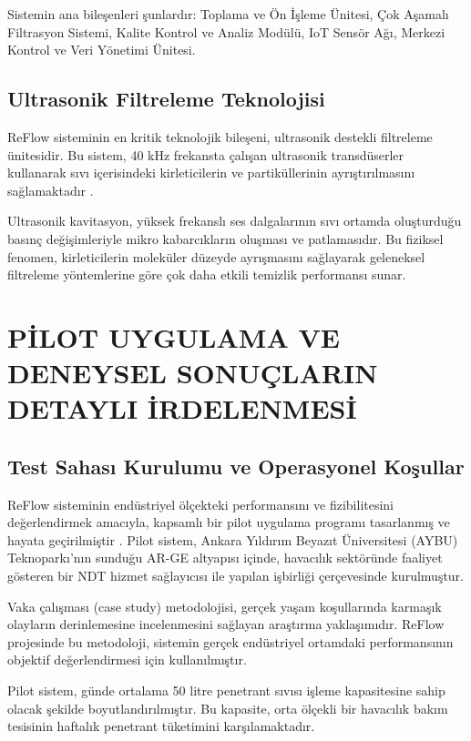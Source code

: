 \documentclass[12pt,a4paper]{article}
\begin{document}
Sistemin ana bileşenleri şunlardır: Toplama ve Ön İşleme Ünitesi, Çok Aşamalı Filtrasyon Sistemi, Kalite Kontrol ve Analiz Modülü, IoT Sensör Ağı, Merkezi Kontrol ve Veri Yönetimi Ünitesi.

\subsection{Ultrasonik Filtreleme Teknolojisi}

ReFlow sisteminin en kritik teknolojik bileşeni, ultrasonik destekli filtreleme ünitesidir. Bu sistem, 40 kHz frekansta çalışan ultrasonik transdüserler kullanarak sıvı içerisindeki kirleticilerin ve partiküllerinin ayrıştırılmasını sağlamaktadır \cite{zhang2018filtration}.

Ultrasonik kavitasyon, yüksek frekanslı ses dalgalarının sıvı ortamda oluşturduğu basınç değişimleriyle mikro kabarcıkların oluşması ve patlamasıdır. Bu fiziksel fenomen, kirleticilerin moleküler düzeyde ayrışmasını sağlayarak geleneksel filtreleme yöntemlerine göre çok daha etkili temizlik performansı sunar.

\section{PİLOT UYGULAMA VE DENEYSEL SONUÇLARIN DETAYLI İRDELENMESİ}

\subsection{Test Sahası Kurulumu ve Operasyonel Koşullar}

ReFlow sisteminin endüstriyel ölçekteki performansını ve fizibilitesini değerlendirmek amacıyla, kapsamlı bir pilot uygulama programı tasarlanmış ve hayata geçirilmiştir \cite{yin2017case}. Pilot sistem, Ankara Yıldırım Beyazıt Üniversitesi (AYBU) Teknoparkı'nın sunduğu AR-GE altyapısı içinde, havacılık sektöründe faaliyet gösteren bir NDT hizmet sağlayıcısı ile yapılan işbirliği çerçevesinde kurulmuştur.

Vaka çalışması (case study) metodolojisi, gerçek yaşam koşullarında karmaşık olayların derinlemesine incelenmesini sağlayan araştırma yaklaşımıdır. ReFlow projesinde bu metodoloji, sistemin gerçek endüstriyel ortamdaki performansının objektif değerlendirmesi için kullanılmıştır.

Pilot sistem, günde ortalama 50 litre penetrant sıvısı işleme kapasitesine sahip olacak şekilde boyutlandırılmıştır. Bu kapasite, orta ölçekli bir havacılık bakım tesisinin haftalık penetrant tüketimini karşılamaktadır.
\end{document}
